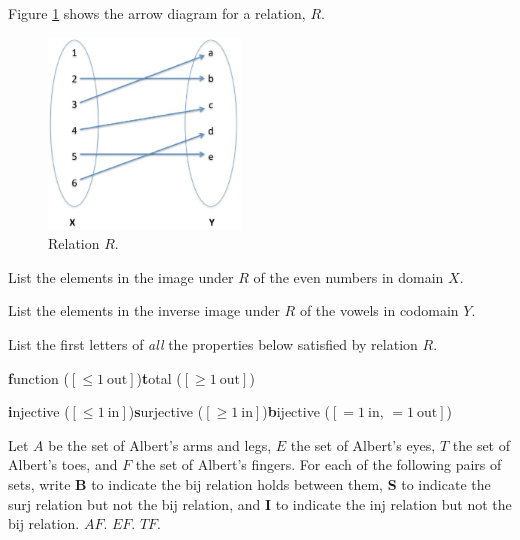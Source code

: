 \documentclass[handout]{mcs}
\begin{document}


\begin{problem}
Figure \ref{fig:img} shows the arrow diagram for a relation, $R$.

\begin{figure}[h]

\includegraphics[height = 2in ]{image-inverseimage2}

\caption{Relation $R$.}
\label{fig:img}
\end{figure}
\bparts

\ppart List the elements in the image under $R$ of the even numbers in domain $X$.\hfill\brule{1.5in}

\ppart List the elements in the inverse image under $R$ of the vowels in codomain $Y$.\hfill\brule{1.5in}

\ppart List the first letters of \emph{all} the properties below
satisfied by relation $R$.\hfill\brule{1.0in}
\begin{center}
 \textbf{f}unction ($[\le 1\ \text{out}]$)\qquad \textbf{t}otal ($[\ge
   1\ \text{out}]$)

 \textbf{i}njective ($[\le 1\ \text{in}]$)\qquad \textbf{s}urjective
 ($[\ge 1\ \text{in}]$)\qquad \textbf{b}ijective ($[= 1\ \text{in, } =
   1\ \text{out}]$)
\end{center}

\eparts
\end{problem}

\begin{problem}
Let $A$ be the set of Albert's arms and legs, $E$ the set of Albert's
eyes, $T$ the set of Albert's toes, and $F$ the set of Albert's
fingers.  For each of the following pairs of sets, write \textbf{B} to
indicate the bij relation holds between them, \textbf{S} to indicate
the surj relation but not the bij relation, and \textbf{I} to indicate
the inj relation but not the bij relation.
\bparts
\ppart $A$\brule{0.3in}$F$.
\ppart $E$\brule{0.3in}$F$.
\ppart $T$\brule{0.3in}$F$.
\eparts
\end{problem}


\end{document}
